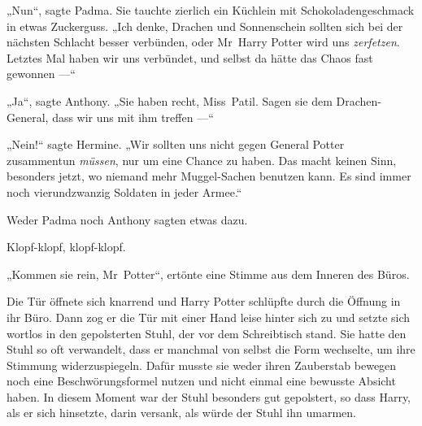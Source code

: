 „Nun“, sagte Padma. Sie tauchte zierlich ein Küchlein mit Schokoladengeschmack in etwas Zuckerguss.
„Ich denke, Drachen und Sonnenschein sollten sich bei der nächsten Schlacht besser verbünden, oder Mr~Harry Potter wird uns \emph{zerfetzen}. Letztes Mal haben wir uns verbündet, und selbst da hätte das Chaos fast gewonnen —“

„Ja“, sagte Anthony.
„Sie haben recht, Miss~Patil. Sagen sie dem Drachen-General, dass wir uns mit ihm treffen —“

„Nein!“ sagte Hermine.
„Wir sollten uns nicht gegen General Potter zusammentun \emph{müssen}, nur um eine Chance zu haben. Das macht keinen Sinn, besonders jetzt, wo niemand mehr Muggel-Sachen benutzen kann. Es sind immer noch vierundzwanzig Soldaten in jeder Armee.“

Weder Padma noch Anthony sagten etwas dazu.

\later

Klopf-klopf, klopf-klopf.

„Kommen sie rein, Mr~Potter“, ertönte eine Stimme aus dem Inneren des Büros.

Die Tür öffnete sich knarrend und Harry Potter schlüpfte durch die Öffnung in ihr Büro. Dann zog er die Tür mit einer Hand leise hinter sich zu und setzte sich wortlos in den gepolsterten Stuhl, der vor dem Schreibtisch stand. Sie hatte den Stuhl so oft verwandelt, dass er manchmal von selbst die Form wechselte, um ihre Stimmung widerzuspiegeln. Dafür musste sie weder ihren Zauberstab bewegen noch eine Beschwörungsformel nutzen und nicht einmal eine bewusste Absicht haben. In diesem Moment war der Stuhl besonders gut gepolstert, so dass Harry, als er sich hinsetzte, darin versank, als würde der Stuhl ihn umarmen.

